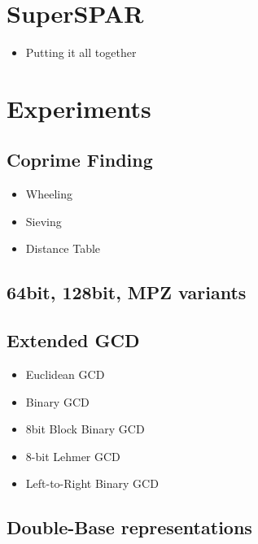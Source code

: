 \documentclass[11pt, letterpaper]{article}
\theoremstyle{definition}
\begin{document}
\bigbreak
\section{SuperSPAR}
\begin{itemize}
\item Putting it all together
\end{itemize}

\bigbreak
\section{Experiments}

\subsection{Coprime Finding}
\begin{itemize}
\item Wheeling
\item Sieving
\item Distance Table
\end{itemize}

\subsection{64bit, 128bit, MPZ variants}

\subsection{Extended GCD}
\begin{itemize}
\item Euclidean GCD
\item Binary GCD
\item 8bit Block Binary GCD
\item 8-bit Lehmer GCD
\item Left-to-Right Binary GCD
\end{itemize}

\subsection{Double-Base representations}
\end{document}
